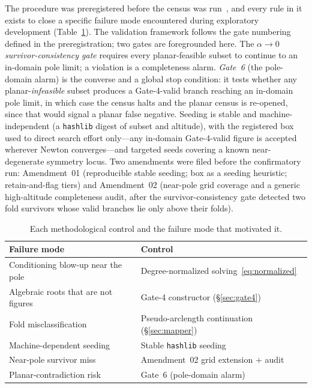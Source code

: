 \documentclass[pdflatex,sn-mathphys-num]{sn-jnl}
\theoremstyle{thmstyleone}%
\theoremstyle{thmstyletwo}%
\theoremstyle{thmstylethree}%
\begin{document}
The procedure was preregistered before the census was run~\cite{prereg}, and
every rule in it exists to close a specific failure mode encountered during
exploratory development (Table~\ref{tab:audit}). The validation framework follows the gate numbering defined in the preregistration; two gates are foregrounded here. The \emph{$\alpha\to0$ survivor-consistency gate} requires every planar-feasible subset to continue to an in-domain pole limit; a violation is a completeness alarm. \emph{Gate~6} (the pole-domain alarm) is the converse and a global stop condition: it tests whether any planar-\emph{infeasible} subset produces a Gate-4-valid branch reaching an in-domain pole limit, in which case the census halts and the planar census is re-opened, since that would signal a planar false negative. Seeding is stable and machine-independent (a \texttt{hashlib} digest of subset and altitude), with the registered box used to direct search effort only---any in-domain Gate-4-valid figure is accepted wherever Newton converges---and targeted seeds covering a known near-degenerate symmetry locus. Two amendments were filed before the confirmatory run: Amendment~01 (reproducible stable seeding; box as a seeding heuristic; retain-and-flag tiers) and Amendment~02 (near-pole grid coverage and a generic high-altitude completeness audit, after the survivor-consistency gate detected two fold survivors whose valid branches lie only above their folds).

\begin{table}[htbp]
\centering
\caption{Each methodological control and the failure mode that motivated it.}
\label{tab:audit}
\begin{tabular}{ll}
\hline
Failure mode & Control \\
\hline
Conditioning blow-up near the pole & Degree-normalized solving~\eqref{eq:normalized} \\
Algebraic roots that are not figures & Gate-4 constructor (\S\ref{sec:gate4}) \\
Fold misclassification & Pseudo-arclength continuation (\S\ref{sec:mapper}) \\
Machine-dependent seeding & Stable \texttt{hashlib} seeding \\
Near-pole survivor miss & Amendment~02 grid extension $+$ audit \\
Planar-contradiction risk & Gate~6 (pole-domain alarm) \\
\hline
\end{tabular}
\end{table}
\end{document}
